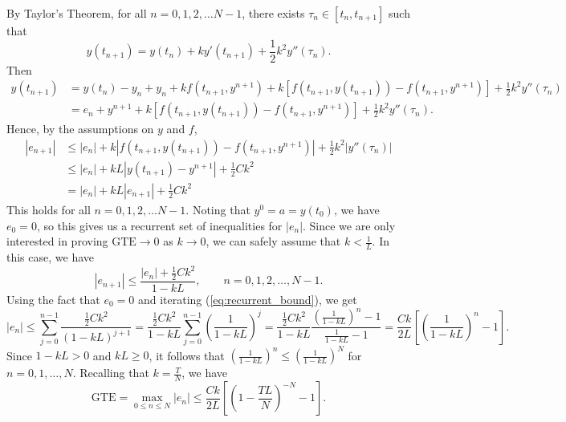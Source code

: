 \documentclass{homework}
\begin{document}
	By Taylor's Theorem, for all $n =0,1,2,\dots N-1$, there exists $\tau_n \in [t_n, t_{n+1}]$ such that
	\begin{equation*}
		y(t_{n+1}) = y(t_n) + ky'(t_{n+1}) + \frac{1}{2}k^2y''(\tau_n).
	\end{equation*}
	Then
	\begin{align*}
		y(t_{n+1}) &= y(t_n) - y_n + y_n + kf\left(t_{n+1}, y^{n+1}\right) + k\left[f(t_{n+1}, y(t_{n+1})) - f\left(t_{n+1}, y^{n+1}\right)\right] + \frac{1}{2}k^2y''(\tau_n) \\
		&= e_n + y^{n+1} +  k\left[f(t_{n+1}, y(t_{n+1})) - f\left(t_{n+1}, y^{n+1}\right)\right] + \frac{1}{2}k^2y''(\tau_n).
	\end{align*}
	Hence, by the assumptions on $y$ and $f$,
	\begin{align*}
		|e_{n+1}| &\le |e_n| +  k\left|f(t_{n+1}, y(t_{n+1})) - f\left(t_{n+1}, y^{n+1}\right)\right| + \frac{1}{2}k^2|y''(\tau_n)| \\
		&\le |e_n| + kL\left|y(t_{n+1}) - y^{n+1}\right| + \frac{1}{2}Ck^2 \\
		&= |e_n| + kL|e_{n+1}| + \frac{1}{2}Ck^2
	\end{align*}
	This holds for all $n = 0,1,2,\dots N-1$. Noting that $y^0 = a = y(t_0)$, we have $e_0 = 0$, so this gives us a recurrent set of inequalities for $|e_n|$. Since we are only interested in proving $\text{GTE} \to 0$ as $k \to 0$, we can safely assume that $k < \frac{1}{L}$. In this case, we have
	\begin{equation}
		\label{eq:recurrent_bound}
		|e_{n+1}| \le \frac{|e_n| + \frac{1}{2}Ck^2}{1-kL}, \qquad n = 0,1,2,\dots, N-1.
	\end{equation}
	Using the fact that $e_0 = 0$ and iterating (\ref{eq:recurrent_bound}), we get
	\begin{equation*}
		|e_n| \le \sum_{j=0}^{n-1} \frac{\frac{1}{2}Ck^2}{(1-kL)^{j+1}} = \frac{\frac{1}{2}Ck^2}{1-kL}\sum_{j=0}^{n-1}\left(\frac{1}{1-kL}\right)^j = \frac{\frac{1}{2}Ck^2}{1-kL}\frac{ \left(\frac{1}{1-kL}\right)^n - 1}{\frac{1}{1-kL} - 1} = \frac{Ck}{2L}\left[\left(\frac{1}{1-kL}\right)^n -1\right].
	\end{equation*}
	Since $1-kL > 0$ and $kL \ge 0$, it follows that $\left(\frac{1}{1-kL}\right)^n \le \left(\frac{1}{1-kL}\right)^N$ for $n = 0,1,\dots, N$. Recalling that $k = \frac{T}{N}$, we have
	\begin{equation*}
		\text{GTE} = \max_{0\le n\le N}|e_n| \le \frac{Ck}{2L}\left[\left(1 - \frac{TL}{N}\right)^{-N} - 1\right].
	\end{equation*}
\end{document}

